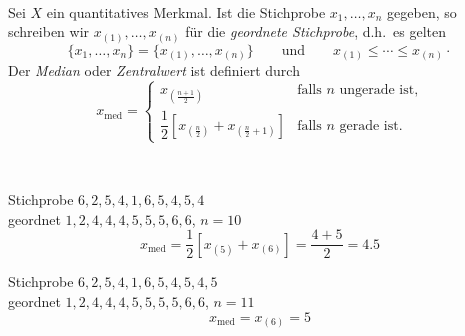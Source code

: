 \begin{defi}  \\
    Sei $X$ ein quantitatives \gls{Merkmal}.
    Ist die Stichprobe $x_1,\dots,x_n$ gegeben, so schreiben wir $x_{(1)},\dots,x_{(n)}$ für die \emph{geordnete Stichprobe}, d.h.\ es gelten
    \[
        \{x_1,\dots,x_n\} = \{x_{(1)},\dots,x_{(n)}\} \qquad\text{und}\qquad x_{(1)}\leq\cdots\leq x_{(n)} \cdot
    \]
    Der \emph{Median} oder \emph{Zentralwert} ist definiert durch
    \[
        x_{\mathrm{med}} =
        \begin{cases}
            x_{\left(\frac{n+1}{2}\right)} & \text{falls } n \text{ ungerade ist,}\\[1ex]
            \dfrac12\left[x_{\left(\frac n2\right)} + x_{\left(\frac n2+1\right)}\right] & \text{falls } n \text{ gerade ist.}
        \end{cases}
    \]
\end{defi}

\begin{bsp}[Würfeln]   \\
    \begin{mytable}
        \begin{minipage}{0.48\textwidth}
            \centering
            Stichprobe $6,2,5,4,1,6,5,4,5,4$\\
            geordnet $1,2,4,4,4,5,5,5,6,6$, $n=10$
            \[
                x_{\mathrm{med}} = \frac12\left[x_{(5)}+x_{(6)}\right] = \frac{4+5}{2} = 4.5
            \]
        \end{minipage}
        \hfill
        \begin{minipage}{0.48\textwidth}
            \centering
            Stichprobe $6,2,5,4,1,6,5,4,5,4,5$\\
            geordnet $1,2,4,4,4,5,5,5,5,6,6$, $n=11$
            \[
                x_{\mathrm{med}} = x_{(6)} = 5
            \]
        \end{minipage}
    \end{mytable}
\end{bsp}

